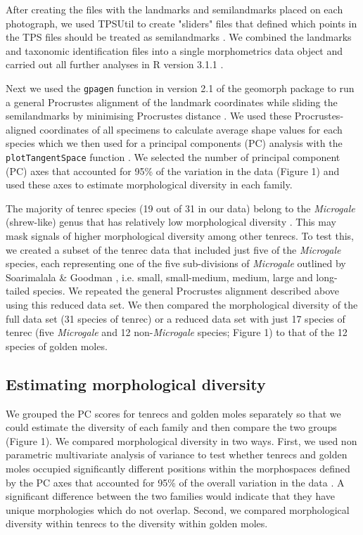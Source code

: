\documentclass[12pt,a4paper]{article}
\begin{document}
	After creating the files with the landmarks and semilandmarks placed on each photograph, we used TPSUtil \citep{Rohlf2012} to create "sliders" files that defined which points in the TPS files should be treated as semilandmarks \citep{Zelditch2012}. We combined the landmarks and taxonomic identification files into a single morphometrics data object and carried out all further analyses in R version 3.1.1 \citep{Team2014}. 
	
	Next we used the \texttt{gpagen} function in version 2.1 of the geomorph package \citep{Adams2014a, Adams2013} to run a general Procrustes alignment \citep{Rohlf1993} of the landmark coordinates while sliding the semilandmarks by minimising Procrustes distance \citep{Bookstein1997}. We used these Procrustes-aligned coordinates of all specimens to calculate average shape values for each species which we then used for a principal components (PC) analysis with the \texttt{plotTangentSpace} function \citep{Adams2013}. We selected the number of principal component (PC) axes that accounted for 95\% of the variation in the data (Figure 1) and used these axes to estimate morphological diversity in each family. 

 	The majority of tenrec species (19 out of 31 in our data) belong to the \textit{Microgale} (shrew-like) genus that has relatively low morphological diversity \citep{Soarimalala2011, Jenkins2003}. This may mask signals of higher morphological diversity among other tenrecs. To test this, we created a subset of the tenrec data that included just five of the \textit{Microgale} species, each representing one of the five sub-divisions of \textit{Microgale} outlined by Soarimalala \& Goodman \citeyearpar{Soarimalala2011}, i.e. small, small-medium, medium, large and long-tailed species. We repeated the general Procrustes alignment described above using this reduced data set. We then compared the morphological diversity of the full data set (31 species of tenrec) or a reduced data set with just 17 species of tenrec (five \textit{Microgale} and 12 non-\textit{Microgale} species; Figure 1) to that of the 12 species of golden moles.
	
\subsection{Estimating morphological diversity}
	
	We grouped the PC scores for tenrecs and golden moles separately so that we could estimate the diversity of each family and then compare the two groups (Figure 1). We compared morphological diversity in two ways. First, we used non parametric multivariate analysis of variance \citep[npMANOVA;][]{Anderson2001} to test whether tenrecs and golden moles occupied significantly different positions within the morphospaces defined by the PC axes that accounted for 95\% of the overall variation in the data \citep[e.g.][]{Serb2011, Ruta2013}. A significant difference between the two families would indicate that they have unique morphologies which do not overlap. Second, we compared morphological diversity within tenrecs to the diversity within golden moles. 
	
\end{document}
